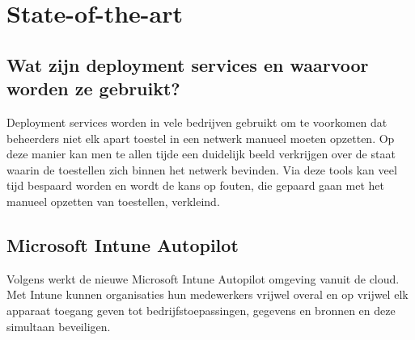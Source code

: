\section{State-of-the-art}
\label{sec:state-of-the-art}



\subsection{Wat zijn deployment services en waarvoor worden ze gebruikt?}
Deployment services worden in vele bedrijven gebruikt om te voorkomen dat beheerders niet elk apart toestel in een netwerk manueel moeten opzetten. Op deze manier kan men te allen tijde een duidelijk beeld verkrijgen over de staat waarin de toestellen zich binnen het netwerk bevinden. Via deze tools kan veel tijd bespaard worden en wordt de kans op fouten, die gepaard gaan met het manueel opzetten van toestellen, verkleind. \autocite{Goessens2020}

\subsection{Microsoft Intune Autopilot}
Volgens \textcite{PCI2021} werkt de nieuwe Microsoft Intune Autopilot omgeving vanuit de cloud. Met Intune kunnen organisaties hun medewerkers vrijwel overal en op vrijwel elk apparaat toegang geven tot bedrijfstoepassingen, gegevens en bronnen en deze simultaan beveiligen.

